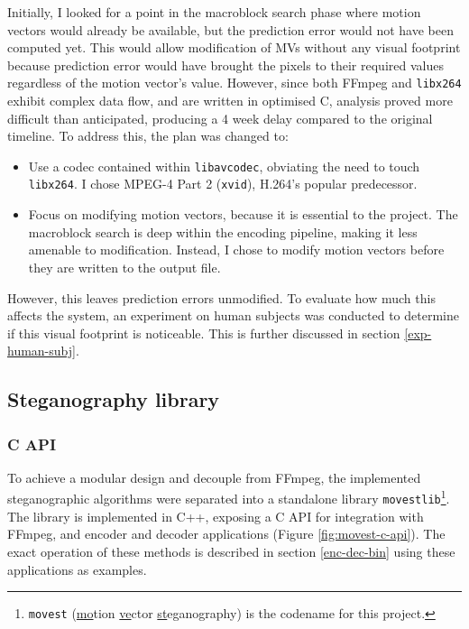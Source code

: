 \documentclass[12pt,british,twoside,notitlepage,usenames,dvipsnames,hypens,final]{report}
\numberwithin{equation}{section}
\numberwithin{figure}{section}
\begin{document}
Initially, I looked for a point in the macroblock search phase where motion vectors would already be available, but the prediction error would not have been computed yet. This would allow modification of MVs without any visual footprint because prediction error would have brought the pixels to their required values regardless of the motion vector's value. However, since both FFmpeg and \texttt{libx264} exhibit complex data flow, and are written in optimised C, analysis proved more difficult than anticipated, producing a 4 week delay compared to the original timeline. To address this, the plan was changed to:
\begin{itemize}
\item Use a codec contained within \texttt{libavcodec}, obviating the need to touch \texttt{libx264}. I chose MPEG-4 Part 2 (\texttt{xvid}), H.264's popular predecessor.
\item Focus on modifying motion vectors, because it is essential to the project. The macroblock search is deep within the encoding pipeline, making it less amenable to modification. Instead, I chose to modify motion vectors before they are written to the output file.
\end{itemize}

However, this leaves prediction errors unmodified. To evaluate how much this affects the system, an experiment on human subjects was conducted to determine if this visual footprint is noticeable. This is further discussed in section \ref{exp-human-subj}.

\subsection{Steganography library}

\subsubsection{C API}

To achieve a modular design and decouple from FFmpeg, the implemented steganographic algorithms were separated into a standalone library \texttt{movestlib}\footnote{\texttt{movest} (\underline{mo}tion \underline{ve}ctor \underline {st}eganography) is the codename for this project.}. The library is implemented in C++, exposing a C API for integration with FFmpeg, and encoder and decoder applications (Figure \ref{fig:movest-c-api}). The exact operation of these methods is described in section \ref{enc-dec-bin} using these applications as examples.
\end{document}
